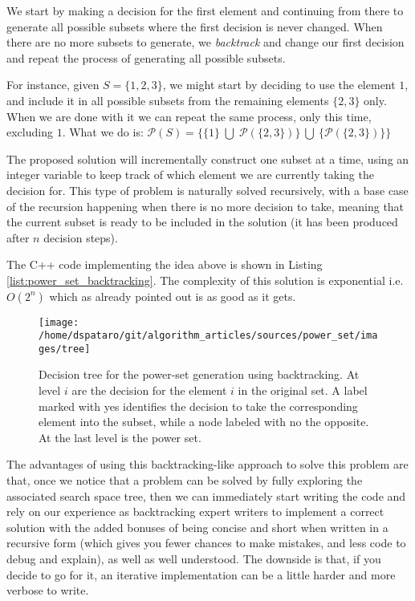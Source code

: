We start by making a decision for the first element and continuing from there to generate all possible subsets
where the first decision is never changed. 
When there are no more subsets to generate, we \textit{backtrack} and change our first
decision and repeat the process of generating all possible subsets.

For instance, given $S=\{1,2,3\}$, we might start by deciding to use the element $1$, and include it in all possible subsets from the remaining elements $\{2, 3\}$ only. 
When we are done with it we can repeat the same process, only this time, excluding $1$. What we do is: $\mathcal{P}(S)= \{\{1\} \; \bigcup \;\mathcal{P}(\{2,3\})\} \: \bigcup \: \{\mathcal{P}(\{2,3\})\}\} 
$

The proposed solution will incrementally construct one subset at a time, 
using an integer variable to keep track of which element we are currently taking the decision for.
This type of problem is naturally solved recursively, with a base case of the recursion happening when there is no more decision
to take, meaning that the current subset is ready to be included in the solution (it has been
produced after $n$ decision steps).

The C++ code implementing the idea above is shown in Listing \ref{list:power_set_backtracking}. The complexity of this solution is exponential i.e. $O(2^n)$ which as already pointed out is as good as
it gets.







\begin{figure}
    \centering
    \texttt{[image: /home/dspataro/git/algorithm\_articles/sources/power\_set/images/tree]}
    \caption[Decision tree for the power-set generation using backtracking.]{Decision tree for the power-set generation using backtracking. At level $i$ are the decision for the element $i$ in the original set. A label marked with yes identifies the decision to take the corresponding element into the subset, while a node labeled with no the opposite. At the last level is the power set.}
    \label{ref:power_set_decision_trees}
\end{figure}

The advantages of using this backtracking-like approach to solve this problem are that, once we notice
that a problem can be solved by fully exploring the associated search space tree, then we can immediately
start writing the code and rely on our experience as backtracking expert writers to implement a correct
solution with the added bonuses of being concise and short when written in a recursive  form (which gives you fewer chances to make mistakes, and less code to debug and explain),  as well
as well understood.
The downside is that, if you decide to go for it, an iterative implementation can be a little harder and more verbose to write.

